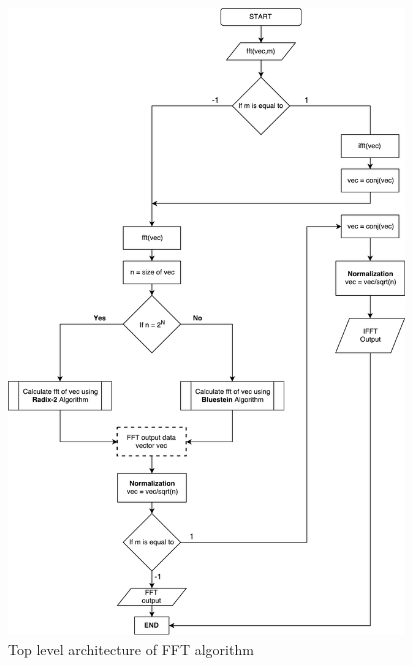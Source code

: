 \begin{figure}[h]
	\centering
	\includegraphics[width=10.5cm]{./algorithms/fft/figures/FFT_flowchart.pdf}
	\caption{Top level architecture of FFT algorithm}\label{FFT_flowchart}
\end{figure}



\newpage
